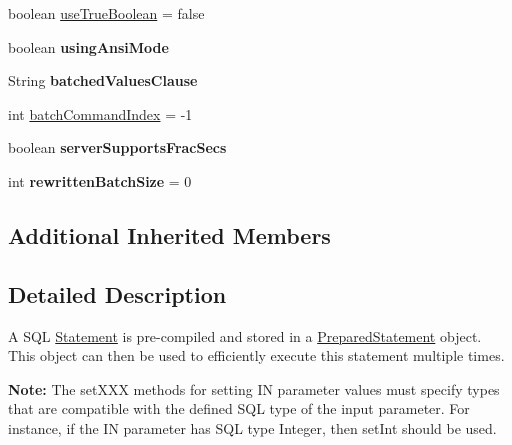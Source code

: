 \begin{DoxyCompactItemize}
\item 
boolean \mbox{\hyperlink{classcom_1_1mysql_1_1jdbc_1_1_prepared_statement_a3fa0bb505083ccf2801bb60dbe416708}{use\+True\+Boolean}} = false
\item 
\mbox{\label{classcom_1_1mysql_1_1jdbc_1_1_prepared_statement_a1d87b3b93d3122ccb6cc9cde36df720e}} 
boolean {\bfseries using\+Ansi\+Mode}
\item 
\mbox{\label{classcom_1_1mysql_1_1jdbc_1_1_prepared_statement_a4a246cebf3dfca10cef5868fd886ee15}} 
String {\bfseries batched\+Values\+Clause}
\item 
int \mbox{\hyperlink{classcom_1_1mysql_1_1jdbc_1_1_prepared_statement_ae44694bcb78c273236f69949567f9d69}{batch\+Command\+Index}} = -\/1
\item 
\mbox{\label{classcom_1_1mysql_1_1jdbc_1_1_prepared_statement_a02f68abf02a7794d087960054333828a}} 
boolean {\bfseries server\+Supports\+Frac\+Secs}
\item 
\mbox{\label{classcom_1_1mysql_1_1jdbc_1_1_prepared_statement_a97e2df611a96a4d356042ceab7b6d7cf}} 
int {\bfseries rewritten\+Batch\+Size} = 0
\end{DoxyCompactItemize}
\subsection*{Additional Inherited Members}


\subsection{Detailed Description}
A S\+QL \mbox{\hyperlink{interfacecom_1_1mysql_1_1jdbc_1_1_statement}{Statement}} is pre-\/compiled and stored in a \mbox{\hyperlink{classcom_1_1mysql_1_1jdbc_1_1_prepared_statement}{Prepared\+Statement}} object. This object can then be used to efficiently execute this statement multiple times.

{\bfseries Note\+:} The set\+X\+XX methods for setting IN parameter values must specify types that are compatible with the defined S\+QL type of the input parameter. For instance, if the IN parameter has S\+QL type Integer, then set\+Int should be used. 

